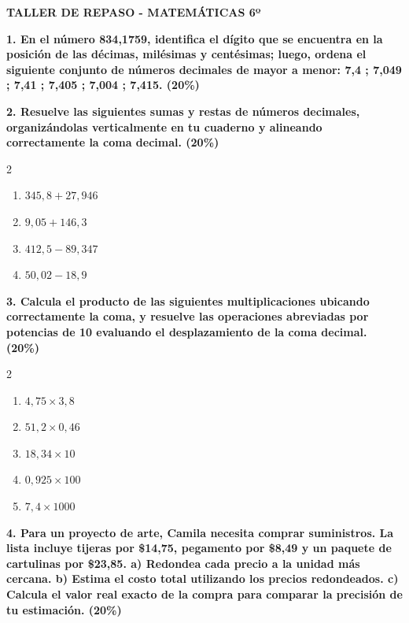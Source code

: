 \documentclass[12pt]{article}
\begin{document}
	
	\begin{center}
		\textbf{\Large TALLER DE REPASO - MATEMÁTICAS 6º}
	\end{center}
	
	\vspace{1cm}
	
	\noindent \textbf{1. En el número 834,1759, identifica el dígito que se encuentra en la posición de las décimas, milésimas y centésimas; luego, ordena el siguiente conjunto de números decimales de mayor a menor: 7,4 ; 7,049 ; 7,41 ; 7,405 ; 7,004 ; 7,415. (20\%)}
	
	\vspace{1cm}
	
	\noindent \textbf{2. Resuelve las siguientes sumas y restas de números decimales, organizándolas verticalmente en tu cuaderno y alineando correctamente la coma decimal. (20\%)}
	\begin{multicols}{2}
		\begin{enumerate}[label=\alph*), itemsep=0.4cm]
			\item $345,8 + 27,946$
			\item $9,05 + 146,3$
			\item $412,5 - 89,347$
			\item $50,02 - 18,9$
		\end{enumerate}
	\end{multicols}
	
	\vspace{0.8cm}
	
	\noindent \textbf{3. Calcula el producto de las siguientes multiplicaciones ubicando correctamente la coma, y resuelve las operaciones abreviadas por potencias de 10 evaluando el desplazamiento de la coma decimal. (20\%)}
	\begin{multicols}{2}
		\begin{enumerate}[label=\alph*), itemsep=0.4cm]
			\item $4,75 \times 3,8$
			\item $51,2 \times 0,46$
			\item $18,34 \times 10$
			\item $0,925 \times 100$
			\item $7,4 \times 1000$
		\end{enumerate}
	\end{multicols}
	
	\vspace{0.8cm}
	
	\noindent \textbf{4. Para un proyecto de arte, Camila necesita comprar suministros. La lista incluye tijeras por \$14,75, pegamento por \$8,49 y un paquete de cartulinas por \$23,85. a) Redondea cada precio a la unidad más cercana. b) Estima el costo total utilizando los precios redondeados. c) Calcula el valor real exacto de la compra para comparar la precisión de tu estimación. (20\%)}
	
\end{document}
